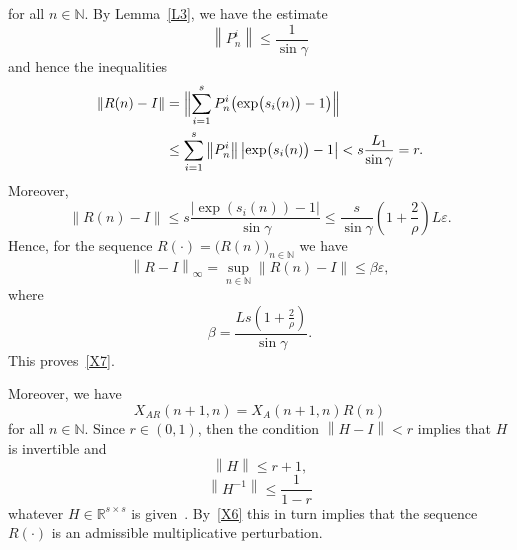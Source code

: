 \documentclass[10pt,a4paper]{amsart}
\theoremstyle{plain}
\begin{document}
for all $n\in \mathbb{N}$. By Lemma~\ref{L3}, we have the estimate 
\begin{equation*}
\left\| P_{n}^{i}\right\| \le \frac{1}{\sin \gamma }
\end{equation*}%
and hence the inequalities 
\begin{equation}
\begin{split}
\left\| R(n)-I\right\| &=  \Bigl\|
\sum\limits_{i=1}^{s}P_{n}^{i}\bigl(\exp\bigl(s_{i}(n)\bigr)-1\bigr)\Bigr\|\\ 
&\le \sum\limits_{i=1}^{s}\left\|
P_{n}^{i}\right\| \left| \exp \bigl( s_{i}( n) \bigr)-1\right| <s\frac{L_{1}}{\sin \gamma }=r. 
\end{split}
\label{X6}
\end{equation}%
Moreover,%
\begin{equation*}
\left\| R(n)-I\right\| \le s\frac{\left| \exp ( s_i(n)) -1\right| }{\sin \gamma }\le \frac{s}{\sin \gamma }\left( 1+%
\frac{2}{\rho }\right) L\varepsilon .
\end{equation*}%
Hence, for the sequence $R(\cdot )=\bigl( R(n)\bigr)_{n\in\mathbb{N}}$ we
have%
\begin{equation*}
\left\| R-I\right\| _{\infty }=\sup_{n\in \mathbb{N}}\left\|
R(n)-I\right\| \le \beta \varepsilon ,
\end{equation*}%
where%
\begin{equation*}
\beta =\frac{Ls\left( 1+\frac{2}{\rho }\right) }{\sin \gamma }.
\end{equation*}%
This proves~\eqref{X7}.


Moreover, we have%
\begin{equation*}
X_{AR}( n+1,n) =X_{A}( n+1,n) R(n)
\end{equation*}%
for all $n\in \mathbb{N}$. Since $r\in ( 0,1) $, then the
condition $\left\| H-I\right\| <r$ implies that $H$ is invertible and%
\begin{equation*}
\left\| H\right\| \le r+1,
\end{equation*}%
\begin{equation*}
\left\| H^{-1}\right\| \le \frac{1}{1-r}
\end{equation*}%
whatever $H\in \mathbb{R}^{s\times s}$ is given~\cite[p.\,301]{HJ}. 
By~\eqref{X6} this
in turn implies that the sequence $R(\cdot )$ is an admissible
multiplicative perturbation.
\end{document}
